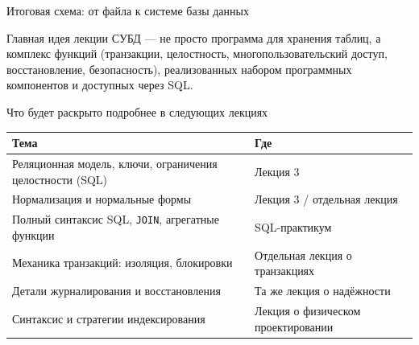 \documentclass[aspectratio=169]{beamer}
\begin{document}
\begin{frame}{Итоговая схема: от файла к системе базы данных}

\begin{center}
\end{center}

\vspace{0.4cm}

\begin{alertblock}{Главная идея лекции}
СУБД — не просто программа для хранения таблиц,
а комплекс функций (транзакции, целостность,
многопользовательский доступ, восстановление,
безопасность), реализованных набором программных
компонентов и доступных через SQL.
\end{alertblock}

\end{frame}


\begin{frame}{Что будет раскрыто подробнее в следующих лекциях}

\small
\begin{table}
\centering
\begin{tabular}{p{}|p{}}
\toprule
\textbf{Тема} & \textbf{Где}\\
\midrule
Реляционная модель, ключи, ограничения целостности (SQL) & Лекция 3\\
Нормализация и нормальные формы & Лекция 3 / отдельная лекция\\
Полный синтаксис SQL, \texttt{JOIN}, агрегатные функции & SQL-практикум\\
Механика транзакций: изоляция, блокировки & Отдельная лекция о транзакциях\\
Детали журналирования и восстановления & Та же лекция о надёжности\\
Синтаксис и стратегии индексирования & Лекция о физическом проектировании\\
\bottomrule
\end{tabular}
\end{table}

\end{frame}
\end{document}
